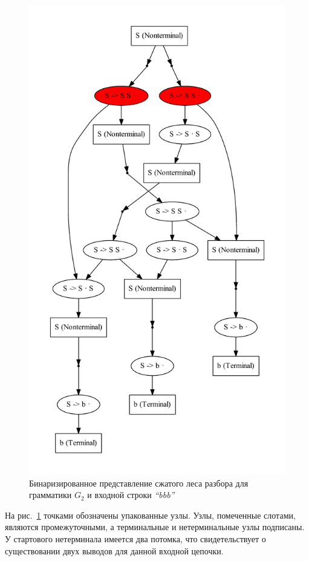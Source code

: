 \begin{figure}
 \centering
 \includegraphics[width=\textwidth]{Ragozina/pics/GLLSppf.pdf}
 \caption{Бинаризированное представление сжатого леса разбора для грамматики $G_2$ и входной строки {\it ``bbb''} }
 \label{SPPF2}
\end{figure}

На рис.~\ref{SPPF2} точками обозначены упакованные узлы. Узлы, помеченные слотами, являются промежуточными, а терминальные и нетерминальные узлы подписаны. У стартового нетерминала имеется два потомка, что свидетельствует о существовании двух выводов для данной входной цепочки.

